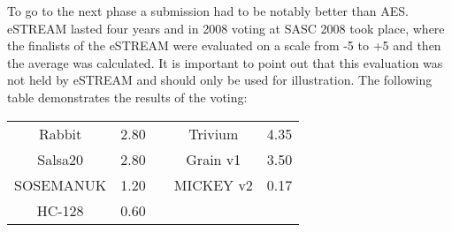 To go to the next phase a submission had to be notably better than AES.\\
eSTREAM lasted four years and in 2008 voting at SASC 2008 took place, where the finalists of the eSTREAM were evaluated on a scale from -5 to +5 and then the average was calculated. It is important to point out that this evaluation was not held by eSTREAM and should only be used for illustration. The following table demonstrates the results of the voting:
\begin{table}[h!]
	\centering
	\begin{tabular}{|c c |c| c c|} 
		\hline 
		Rabbit & 2.80 & & Trivium & 4.35\\ 
		Salsa20 & 2.80 & & Grain v1 & 3.50\\
		SOSEMANUK & 1.20 & & MICKEY v2& 0.17\\
		HC-128 & 0.60 & & & \\[1ex]
		\hline
	\end{tabular}
	\label{table:eStream portfolio with SASC2008 evaluation}
\end{table}

